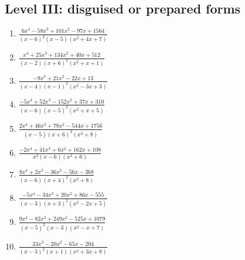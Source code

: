 \documentclass[11pt,oneside]{book}
\begin{document}
\subsection*{Level III: disguised or prepared forms}
\begin{enumerate}[leftmargin=*,label=\textbf{\arabic*.},itemsep=0.65\baselineskip]
\item $\displaystyle \frac{6 x^{4} - 58 x^{3} + 101 x^{2} - 97 x + 1564}{\left(x - 6\right)^{2} \left(x - 5\right) \left(x^{2} + 4 x + 7\right)}$
\item $\displaystyle \frac{x^{4} + 25 x^{3} + 134 x^{2} + 40 x + 512}{\left(x - 2\right) \left(x + 6\right)^{2} \left(x^{2} + x + 1\right)}$
\item $\displaystyle \frac{- 9 x^{3} + 21 x^{2} - 22 x + 13}{\left(x - 4\right) \left(x - 1\right)^{2} \left(x^{2} - 3 x + 3\right)}$
\item $\displaystyle \frac{- 5 x^{4} + 52 x^{3} - 152 x^{2} + 37 x + 310}{\left(x - 6\right) \left(x - 5\right)^{2} \left(x^{2} + x + 5\right)}$
\item $\displaystyle \frac{2 x^{4} + 46 x^{3} + 78 x^{2} - 544 x + 1756}{\left(x - 5\right) \left(x + 6\right)^{2} \left(x^{2} + 8\right)}$
\item $\displaystyle \frac{- 2 x^{4} + 41 x^{3} + 6 x^{2} + 162 x + 108}{x^{2} \left(x - 6\right) \left(x^{2} + 6\right)}$
\item $\displaystyle \frac{8 x^{4} + 2 x^{3} - 36 x^{2} - 56 x - 368}{\left(x - 6\right) \left(x + 4\right)^{2} \left(x^{2} + 8\right)}$
\item $\displaystyle \frac{- 5 x^{4} - 34 x^{3} + 20 x^{2} + 86 x - 555}{\left(x - 3\right) \left(x + 3\right)^{2} \left(x^{2} - 2 x + 5\right)}$
\item $\displaystyle \frac{9 x^{4} - 82 x^{3} + 249 x^{2} - 525 x + 1079}{\left(x - 5\right)^{2} \left(x - 3\right) \left(x^{2} - x + 7\right)}$
\item $\displaystyle \frac{33 x^{3} - 20 x^{2} - 65 x - 204}{\left(x - 3\right)^{2} \left(x + 1\right) \left(x^{2} + 3 x + 8\right)}$
\end{enumerate}
\end{document}

